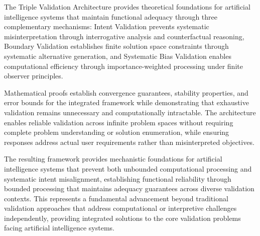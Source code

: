 \documentclass[12pt,a4paper]{article}
\begin{document}
The Triple Validation Architecture provides theoretical foundations for artificial intelligence systems that maintain functional adequacy through three complementary mechanisms: Intent Validation prevents systematic misinterpretation through interrogative analysis and counterfactual reasoning, Boundary Validation establishes finite solution space constraints through systematic alternative generation, and Systematic Bias Validation enables computational efficiency through importance-weighted processing under finite observer principles.

Mathematical proofs establish convergence guarantees, stability properties, and error bounds for the integrated framework while demonstrating that exhaustive validation remains unnecessary and computationally intractable. The architecture enables reliable validation across infinite problem spaces without requiring complete problem understanding or solution enumeration, while ensuring responses address actual user requirements rather than misinterpreted objectives.

The resulting framework provides mechanistic foundations for artificial intelligence systems that prevent both unbounded computational processing and systematic intent misalignment, establishing functional reliability through bounded processing that maintains adequacy guarantees across diverse validation contexts. This represents a fundamental advancement beyond traditional validation approaches that address computational or interpretive challenges independently, providing integrated solutions to the core validation problems facing artificial intelligence systems.
\end{document}
